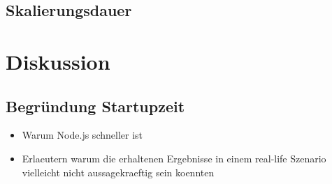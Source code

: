 \subsection{Skalierungsdauer}
\label{ss:skalierungsdauer}



\section{Diskussion}

\subsection{Begr\"undung Startupzeit}
\begin{itemize}
  \item Warum Node.js schneller ist
\end{itemize}

\begin{itemize}
  \item Erlaeutern warum die erhaltenen Ergebnisse in einem real-life Szenario vielleicht nicht aussagekraeftig sein koennten
\end{itemize}
